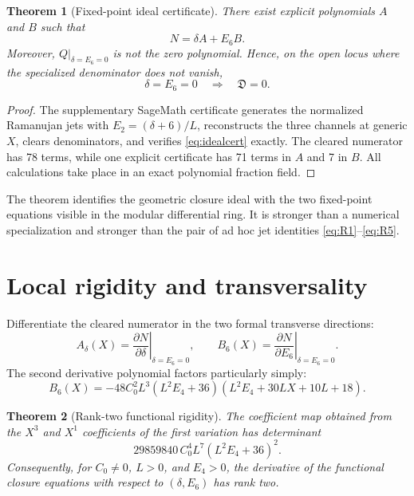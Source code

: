 \documentclass[11pt]{article}
\newtheorem{theorem}{Theorem}[section]
\theoremstyle{definition}
\theoremstyle{remark}
\newcommand{\cD}{\mathfrak{D}}
\begin{document}
\begin{theorem}[Fixed-point ideal certificate]\label{thm:ideal}
There exist explicit polynomials \(A\) and \(B\) such that
\begin{equation}\label{eq:idealcert}
 N=\delta A+E_6B.
\end{equation}
Moreover, \(Q|_{\delta=E_6=0}\) is not the zero polynomial.  Hence, on the open locus where the specialized denominator does not vanish,
\[
 \delta=E_6=0\quad\Longrightarrow\quad\cD=0.
\]
\end{theorem}

\begin{proof}
The supplementary SageMath certificate generates the normalized Ramanujan jets with \(E_2=(\delta+6)/L\), reconstructs the three channels at generic \(X\), clears denominators, and verifies \eqref{eq:idealcert} exactly.  The cleared numerator has 78 terms, while one explicit certificate has 71 terms in \(A\) and 7 in \(B\).  All calculations take place in an exact polynomial fraction field.
\end{proof}

The theorem identifies the geometric closure ideal with the two fixed-point equations visible in the modular differential ring.  It is stronger than a numerical specialization and stronger than the pair of ad hoc jet identities \eqref{eq:R1}--\eqref{eq:R5}.

\section{Local rigidity and transversality}

Differentiate the cleared numerator in the two formal transverse directions:
\[
 A_\delta(X)=\left.\frac{\partial N}{\partial\delta}\right|_{\delta=E_6=0},
 \qquad
 B_6(X)=\left.\frac{\partial N}{\partial E_6}\right|_{\delta=E_6=0}.
\]
The second derivative polynomial factors particularly simply:
\begin{equation}\label{eq:B6}
 B_6(X)
 =-48C_0^2L^3(L^2E_4+36)
 (L^2E_4+30LX+10L+18).
\end{equation}

\begin{theorem}[Rank-two functional rigidity]\label{thm:ranktwo}
The coefficient map obtained from the \(X^3\) and \(X^1\) coefficients of the first variation has determinant
\begin{equation}\label{eq:jacdet}
 29859840\,C_0^4L^7(L^2E_4+36)^2.
\end{equation}
Consequently, for \(C_0\ne0\), \(L>0\), and \(E_4>0\), the derivative of the functional closure equations with respect to \((\delta,E_6)\) has rank two.
\end{theorem}
\end{document}
